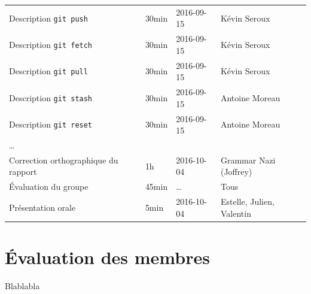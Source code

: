 \documentclass[11pt,canadien]{article}
\begin{document}
\begin{appendices}
\begin{tabular}{l l l l}
	\\ Description \texttt{git push}        & 30min & 2016-09-15 & Kévin Seroux
	\\ Description \texttt{git fetch}       & 30min & 2016-09-15 & Kévin Seroux
	\\ Description \texttt{git pull}        & 30min & 2016-09-15 & Kévin Seroux
	\\ Description \texttt{git stash}       & 30min & 2016-09-15 & Antoine Moreau
	\\ Description \texttt{git reset}       & 30min & 2016-09-15 & Antoine Moreau
	\\ \ldots
	\\ Correction orthographique du rapport & 1h    & 2016-10-04 & Grammar Nazi (Joffrey)
	\\ Évaluation du groupe                 & 45min & \ldots     & Tous
	\\ Présentation orale                   & 5min  & 2016-10-04 & Estelle, Julien, Valentin
\end{tabular}

\newpage
\section{Évaluation des membres}
Blablabla

\end{appendices}
\end{document}
